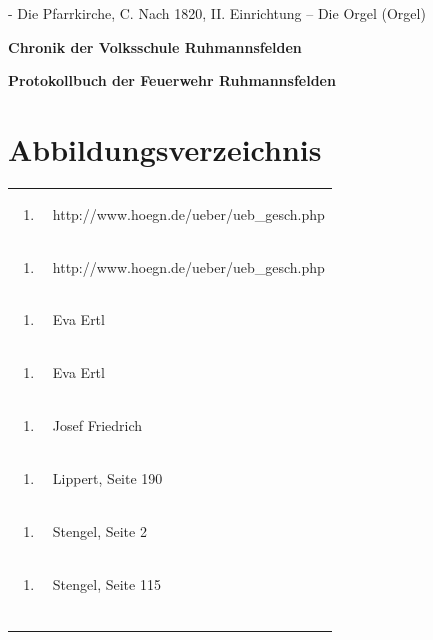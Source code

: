 \documentclass[a4paper]{article}
\newcounter{Abb}
\begin{document}
{}- Die Pfarrkirche, C. Nach 1820, II. Einrichtung – Die Orgel (Orgel)

{\bfseries
Chronik der Volksschule Ruhmannsfelden}

{\bfseries
Protokollbuch der Feuerwehr Ruhmannsfelden}

\section{Abbildungsverzeichnis}
\hypertarget{RefHeadingToc100333758}{}\begin{flushleft}
\tablefirsthead{}
\tablehead{}
\tabletail{}
\tablelasttail{}
\begin{supertabular}{m{1.2409999cm}m{14.604cm}}
\begin{enumerate}
\item
\end{enumerate}
 &
http://www.hoegn.de/ueber/ueb\_gesch.php\\
\begin{enumerate}
\item
\end{enumerate}
 &
http://www.hoegn.de/ueber/ueb\_gesch.php\\
\begin{enumerate}
\item
\end{enumerate}
 &
Eva Ertl\\
\begin{enumerate}
\item
\end{enumerate}
 &
Eva Ertl\\
\begin{enumerate}
\item
\end{enumerate}
 &
Josef Friedrich\\
\begin{enumerate}
\item
\end{enumerate}
 &
Lippert, Seite 190\\
\begin{enumerate}
\item
\end{enumerate}
 &
Stengel, Seite 2\\
\begin{enumerate}
\item
\end{enumerate}
 &
Stengel, Seite 115\\
\begin{enumerate}

\end{enumerate}
\end{supertabular}
\end{flushleft}
\end{document}
